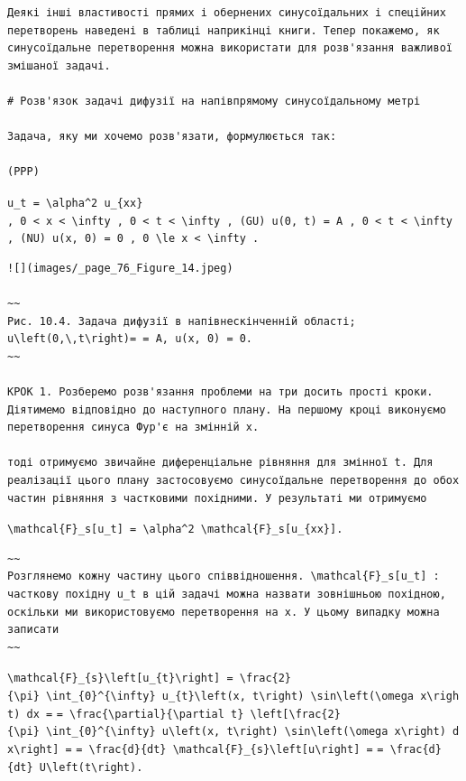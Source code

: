 \documentclass[
  ukrainian,
]{article}
\begin{document}
\begin{verbatim}
Деякі інші властивості прямих і обернених синусоїдальних і спеційних перетворень наведені в таблиці наприкінці книги. Тепер покажемо, як синусоїдальне перетворення можна використати для розв'язання важливої змішаної задачі.

# Розв'язок задачі дифузії на напівпрямому синусоїдальному метрі

Задача, яку ми хочемо розв'язати, формулюється так:

(PPP)
\end{verbatim}

\texttt{u\_t\ =\ \textbackslash{}alpha\^{}2\ u\_\{xx\}}
\texttt{,\ 0\ \textless{}\ x\ \textless{}\ \textbackslash{}infty\ ,\ 0\ \textless{}\ t\ \textless{}\ \textbackslash{}infty\ ,\ (GU)\ u(0,\ t)\ =\ A\ ,\ 0\ \textless{}\ t\ \textless{}\ \textbackslash{}infty\ ,\ (NU)\ u(x,\ 0)\ =\ 0\ ,\ 0\ \textbackslash{}le\ x\ \textless{}\ \textbackslash{}infty\ .}

\begin{verbatim}
![](images/_page_76_Figure_14.jpeg)

~~
Рис. 10.4. Задача дифузії в напівнескінченній області; u\left(0,\,t\right)= = A, u(x, 0) = 0.
~~

КРОК 1. Розберемо розв'язання проблеми на три досить прості кроки. Діятимемо відповідно до наступного плану. На першому кроці виконуємо перетворення синуса Фур'є на змінній x.

тоді отримуємо звичайне диференціальне рівняння для змінної t. Для реалізації цього плану застосовуємо синусоїдальне перетворення до обох частин рівняння з частковими похідними. У результаті ми отримуємо
\end{verbatim}

\texttt{\textbackslash{}mathcal\{F\}\_s{[}u\_t{]}\ =\ \textbackslash{}alpha\^{}2\ \textbackslash{}mathcal\{F\}\_s{[}u\_\{xx\}{]}.}

\begin{verbatim}
~~
Розглянемо кожну частину цього співвідношення. \mathcal{F}_s[u_t] : часткову похідну u_t в цій задачі можна назвати зовнішньою похідною, оскільки ми використовуємо перетворення на x. У цьому випадку можна записати
~~
\end{verbatim}

\texttt{\textbackslash{}mathcal\{F\}\_\{s\}\textbackslash{}left{[}u\_\{t\}\textbackslash{}right{]}\ =\ \textbackslash{}frac\{2\}\{\textbackslash{}pi\}\ \textbackslash{}int\_\{0\}\^{}\{\textbackslash{}infty\}\ u\_\{t\}\textbackslash{}left(x,\ t\textbackslash{}right)\ \textbackslash{}sin\textbackslash{}left(\textbackslash{}omega\ x\textbackslash{}right)\ dx\ =}
\texttt{=\ \textbackslash{}frac\{\textbackslash{}partial\}\{\textbackslash{}partial\ t\}\ \textbackslash{}left{[}\textbackslash{}frac\{2\}\{\textbackslash{}pi\}\ \textbackslash{}int\_\{0\}\^{}\{\textbackslash{}infty\}\ u\textbackslash{}left(x,\ t\textbackslash{}right)\ \textbackslash{}sin\textbackslash{}left(\textbackslash{}omega\ x\textbackslash{}right)\ dx\textbackslash{}right{]}\ =}
\texttt{=\ \textbackslash{}frac\{d\}\{dt\}\ \textbackslash{}mathcal\{F\}\_\{s\}\textbackslash{}left{[}u\textbackslash{}right{]}\ =}
\texttt{=\ \textbackslash{}frac\{d\}\{dt\}\ U\textbackslash{}left(t\textbackslash{}right).}
\end{document}
